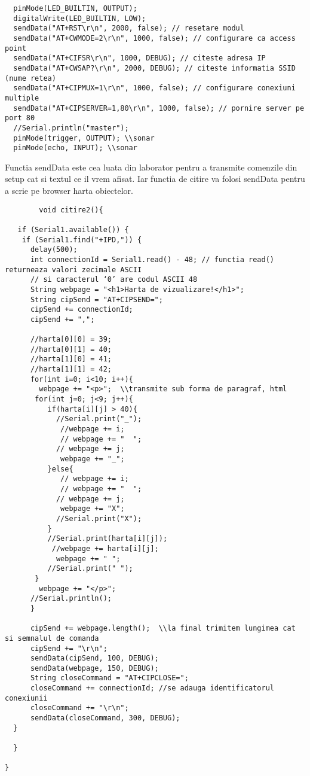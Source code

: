 \begin{itemize}
\begin{verbatim}
  pinMode(LED_BUILTIN, OUTPUT); 
  digitalWrite(LED_BUILTIN, LOW); 
  sendData("AT+RST\r\n", 2000, false); // resetare modul 
  sendData("AT+CWMODE=2\r\n", 1000, false); // configurare ca access point 
  sendData("AT+CIFSR\r\n", 1000, DEBUG); // citeste adresa IP 
  sendData("AT+CWSAP?\r\n", 2000, DEBUG); // citeste informatia SSID (nume retea) 
  sendData("AT+CIPMUX=1\r\n", 1000, false); // configurare conexiuni multiple 
  sendData("AT+CIPSERVER=1,80\r\n", 1000, false); // pornire server pe port 80 
  //Serial.println("master");
  pinMode(trigger, OUTPUT); \\sonar
  pinMode(echo, INPUT); \\sonar
	\end{verbatim}

	\tab Functia sendData este cea luata din laborator pentru a transmite comenzile din setup cat si textul ce il vrem afisat. Iar functia de citire va folosi sendData pentru a scrie pe browser harta obiectelor.\\
	\begin{verbatim}
		void citire2(){

   if (Serial1.available()) { 
    if (Serial1.find("+IPD,")) { 
      delay(500); 
      int connectionId = Serial1.read() - 48; // functia read() returneaza valori zecimale ASCII 
      // si caracterul ‘0’ are codul ASCII 48 
      String webpage = "<h1>Harta de vizualizare!</h1>"; 
      String cipSend = "AT+CIPSEND="; 
      cipSend += connectionId; 
      cipSend += ","; 

      //harta[0][0] = 39;
      //harta[0][1] = 40;
      //harta[1][0] = 41;
      //harta[1][1] = 42;
      for(int i=0; i<10; i++){
        webpage += "<p>";  \\transmite sub forma de paragraf, html
       for(int j=0; j<9; j++){
          if(harta[i][j] > 40){
            //Serial.print("_");
             //webpage += i; 
             // webpage += "  ";   
            // webpage += j;  
             webpage += "_";  
          }else{
             // webpage += i; 
             // webpage += "  ";   
            // webpage += j;  
             webpage += "X"; 
            //Serial.print("X");
          }
          //Serial.print(harta[i][j]);
           //webpage += harta[i][j];
            webpage += " ";  
          //Serial.print(" ");
       }
        webpage += "</p>"; 
      //Serial.println();
      } 

      cipSend += webpage.length();  \\la final trimitem lungimea cat si semnalul de comanda
      cipSend += "\r\n"; 
      sendData(cipSend, 100, DEBUG); 
      sendData(webpage, 150, DEBUG); 
      String closeCommand = "AT+CIPCLOSE="; 
      closeCommand += connectionId; //se adauga identificatorul conexiunii 
      closeCommand += "\r\n"; 
      sendData(closeCommand, 300, DEBUG); 
  }
 
  }
  
}
       \end{verbatim}
\end{itemize}
	